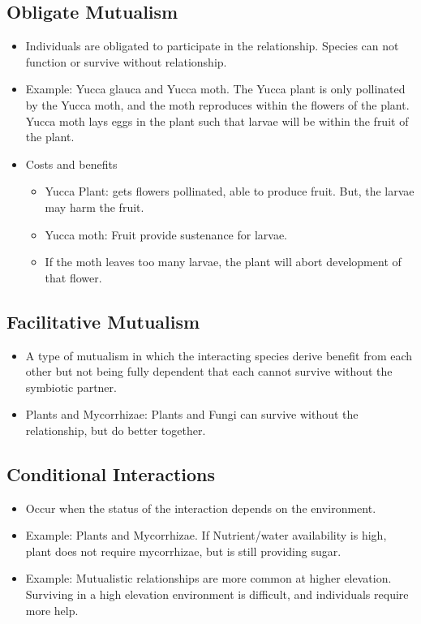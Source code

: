 \documentclass[12pt]{article}
\begin{document}
\subsection{Obligate Mutualism}
\begin{itemize}
    \item Individuals are obligated to participate in the relationship. Species can not function or survive without relationship.
    \item Example: Yucca glauca and Yucca moth. The Yucca plant is only pollinated by the Yucca moth, and the moth reproduces within the flowers of the plant. Yucca moth lays eggs in the plant such that larvae will be within the fruit of the plant.
    \item Costs and benefits
          \begin{itemize}
              \item Yucca Plant: gets flowers pollinated, able to produce fruit. But, the larvae may harm the fruit.
              \item Yucca moth: Fruit provide sustenance for larvae.
              \item If the moth leaves too many larvae, the plant will abort development of that flower.
          \end{itemize}
\end{itemize}

\subsection{Facilitative Mutualism}
\begin{itemize}
    \item A type of mutualism in which the interacting species derive benefit from each other but not being fully dependent that each cannot survive without the symbiotic partner.
    \item Plants and Mycorrhizae: Plants and Fungi can survive without the relationship, but do better together.
\end{itemize}

\subsection{Conditional Interactions}
\begin{itemize}
    \item Occur when the status of the interaction depends on the environment.
    \item Example: Plants and Mycorrhizae. If Nutrient/water availability is high, plant does not require mycorrhizae, but is still providing sugar.
    \item Example: Mutualistic relationships are more common at higher elevation. Surviving in a high elevation environment is difficult, and individuals require more help.
\end{itemize}
\end{document}

